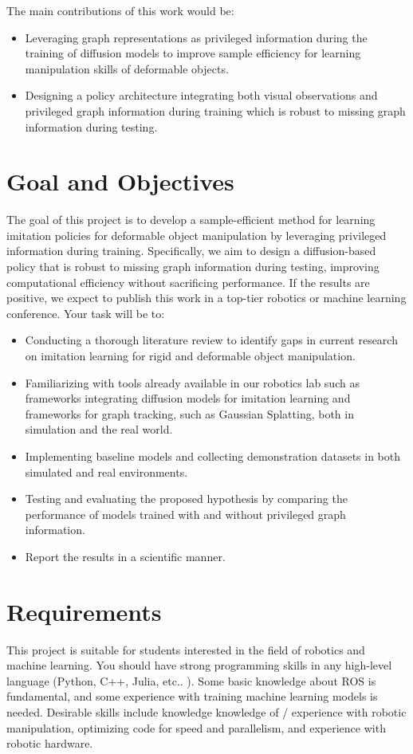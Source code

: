 The main contributions of this work would be:
\begin{itemize}
    \item Leveraging graph representations as privileged information during the training of diffusion models to improve sample efficiency for learning manipulation skills of deformable objects.
    \item Designing a policy architecture integrating both visual observations and privileged graph information during training which is robust to missing graph information during testing.
\end{itemize}


\section*{Goal and Objectives}

The goal of this project is to develop a sample-efficient method for learning imitation policies for deformable object manipulation by leveraging privileged information during training. Specifically, we aim to design a diffusion-based policy that is robust to missing graph information during testing, improving computational efficiency without sacrificing performance. If the results are positive, we expect to publish this work in a top-tier robotics or machine learning conference.
Your task will be to:
\begin{itemize}
    \item Conducting a thorough literature review to identify gaps in current research on imitation learning for rigid and deformable object manipulation.
    \item Familiarizing with tools already available in our robotics lab such as frameworks integrating diffusion models for imitation learning and frameworks for graph tracking, such as Gaussian Splatting, both in simulation and the real world.
    \item Implementing baseline models and collecting demonstration datasets in both simulated and real environments.
    \item Testing and evaluating the proposed hypothesis by comparing the performance of models trained with and without privileged graph information.
    \item Report the results in a scientific manner.
\end{itemize}

\section*{Requirements}

This project is suitable for students interested in the field of robotics and machine learning. You should have strong programming skills in any high-level language (Python, C++, Julia, etc.. ). Some basic knowledge about ROS is fundamental, and some experience with training machine learning models is needed. Desirable skills include knowledge knowledge of / experience with robotic manipulation, optimizing code for speed and parallelism, and experience with robotic hardware.